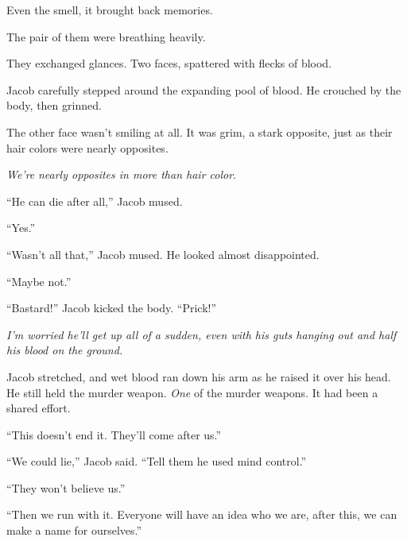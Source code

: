 Even the smell, it brought back memories.



\blacksquare






The pair of them were breathing heavily.



They exchanged glances.  Two faces, spattered with flecks of blood.



Jacob carefully stepped around the expanding pool of blood.  He crouched by the body, then grinned.



The other face wasn't smiling at all.  It was grim, a stark opposite, just as their hair colors were nearly opposites.



\emph{We're}\emph{ nearly opposites in more than hair color}.



``He can die after all,'' Jacob mused.



``Yes.''



``Wasn't all that,'' Jacob mused.  He looked almost disappointed.



``Maybe not.''



``Bastard!''  Jacob kicked the body.  ``Prick!''



\emph{I'm worried he'll get up all of a sudden, even with his guts hanging out and half his blood on the ground.}



Jacob stretched, and wet blood ran down his arm as he raised it over his head.  He still held the murder weapon.  \emph{One} of the murder weapons.  It had been a shared effort.



``This doesn't end it.  They'll come after us.''



``We could lie,'' Jacob said.  ``Tell them he used mind control.''



``They won't believe us.''



``Then we run with it.  Everyone will have an idea who we are, after this, we can make a name for ourselves.''



